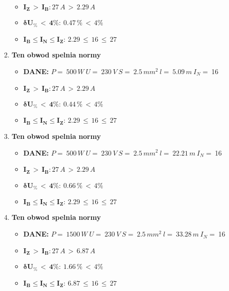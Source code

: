 \begin{enumerate}
\begin{itemize}
\item[\textcolor{Green}{\cmark}] $ \pmb{I_Z \, >  \, I_B: }27 \, A \, > \,2.29 \, A $
\item[\textcolor{Green}{\cmark}] $ \pmb{ \delta U_\% \, < \, 4\%:} \:0.47 \, \% \,< \, 4\% $
\item[\textcolor{Green}{\cmark}] $ \pmb{I_B \le I_N \le I_Z: } \, 2.29 \, \le \,16 \, \le \,27 $
\end{itemize}
\item \textcolor{Green}{\cmark} \textbf{Ten obwod spelnia normy} 
\begin{itemize}
\item[] \textbf{DANE: } \: $ P = \:500\, W\: U = \:230\: V\: S = \:2.5\, mm^2\: l = \:5.09\, m\: I_N= \: $16
\item[\textcolor{Green}{\cmark}] $ \pmb{I_Z \, >  \, I_B: }27 \, A \, > \,2.29 \, A $
\item[\textcolor{Green}{\cmark}] $ \pmb{ \delta U_\% \, < \, 4\%:} \:0.44 \, \% \,< \, 4\% $
\item[\textcolor{Green}{\cmark}] $ \pmb{I_B \le I_N \le I_Z: } \, 2.29 \, \le \,16 \, \le \,27 $
\end{itemize}
\item \textcolor{Green}{\cmark} \textbf{Ten obwod spelnia normy} 
\begin{itemize}
\item[] \textbf{DANE: } \: $ P = \:500\, W\: U = \:230\: V\: S = \:2.5\, mm^2\: l = \:22.21\, m\: I_N= \: $16
\item[\textcolor{Green}{\cmark}] $ \pmb{I_Z \, >  \, I_B: }27 \, A \, > \,2.29 \, A $
\item[\textcolor{Green}{\cmark}] $ \pmb{ \delta U_\% \, < \, 4\%:} \:0.66 \, \% \,< \, 4\% $
\item[\textcolor{Green}{\cmark}] $ \pmb{I_B \le I_N \le I_Z: } \, 2.29 \, \le \,16 \, \le \,27 $
\end{itemize}
\item \textcolor{Green}{\cmark} \textbf{Ten obwod spelnia normy} 
\begin{itemize}
\item[] \textbf{DANE: } \: $ P = \:1500\, W\: U = \:230\: V\: S = \:2.5\, mm^2\: l = \:33.28\, m\: I_N= \: $16
\item[\textcolor{Green}{\cmark}] $ \pmb{I_Z \, >  \, I_B: }27 \, A \, > \,6.87 \, A $
\item[\textcolor{Green}{\cmark}] $ \pmb{ \delta U_\% \, < \, 4\%:} \:1.66 \, \% \,< \, 4\% $
\item[\textcolor{Green}{\cmark}] $ \pmb{I_B \le I_N \le I_Z: } \, 6.87 \, \le \,16 \, \le \,27 $

\end{itemize}
\end{enumerate}
